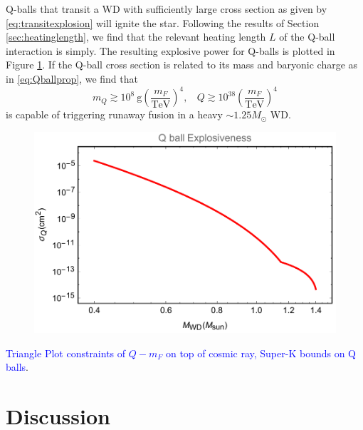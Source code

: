 \documentclass[twocolumn,showpacs,preprintnumbers,amsmath,amssymb,prd]{revtex4}
\def\r{\right)}
\def\l{\left(}
\begin{document}
Q-balls that transit a WD with sufficiently large cross section as given by \eqref{eq:transitexplosion} will ignite the star. Following the results of Section \ref{sec:heatinglength}, we find that the relevant heating length $L$ of the Q-ball interaction is simply. The resulting explosive power for Q-balls is plotted in Figure \ref{fig:boomQball}. If the Q-ball cross section is related to its mass and baryonic charge as in \eqref{eq:Qballprop}, we find that
\begin{equation}
m_Q \gtrsim 10^8 ~\text{g} \l\frac{m_F}{\text{TeV}}\r^4, ~~~~ Q \gtrsim 10^{38} \l\frac{m_F}{\text{TeV}}\r^4
\end{equation}
is capable of triggering runaway fusion in a heavy $\sim 1.25 M_{\odot}$ WD.

\begin{figure}
\label{fig:boomQball}
\includegraphics[scale=.45]{boomQball.pdf}
\end{figure}

\textcolor{blue}{Triangle Plot constraints of $Q - m_F$ on top of cosmic ray, Super-K bounds on Q balls}.

\section{Discussion}
\label{sec:discussion}
\end{document}
